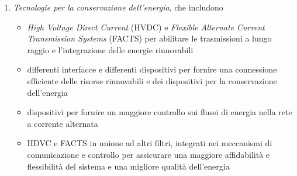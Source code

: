 \begin{enumerate}
\begin{itemize}
	\end{itemize}
\item \textit{Tecnologie per la conservazione dell'energia}, che includono
	\begin{itemize}
	\item \textit{High Voltage Direct Current} (HVDC) e \textit{Flexible Alternate Current Transmission Systems} (FACTS) per abilitare le trasmissioni a lungo raggio e l'integrazione delle energie rinnovabili
	\item differenti interfacce e differenti dispositivi per fornire una connessione efficiente delle risorse rinnovabili e dei dispositivi per la conservazione dell'energia
	\item dispositivi per fornire un maggiore controllo sui flussi di energia nella rete a corrente alternata
	\item  HDVC e FACTS in unione ad altri filtri, integrati nei meccanismi di comunicazione e controllo per assicurare una maggiore affidabilità e flessibilità del sistema e una migliore qualità dell'energia
	\end{itemize}
\end{enumerate}